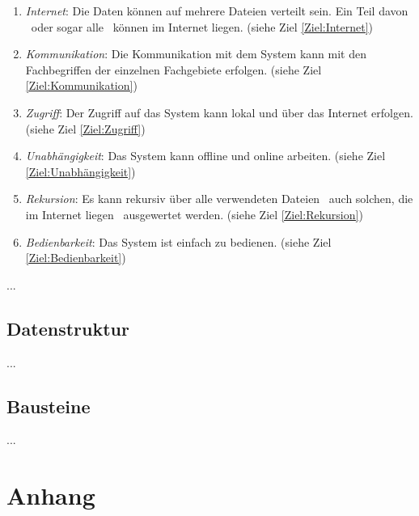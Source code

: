 \documentclass[english,ngerman,parskip=half,headsepline,footsepline]{scrreprt}
\begin{document}
\begin{enumerate}
		\item \label{Anforderung:Internet} \emph{Internet}: Die Daten können auf mehrere Dateien verteilt sein. Ein Teil davon \textendash\ oder sogar alle \textendash\ können im Internet liegen. (siehe Ziel \vref{Ziel:Internet})
		
		\item \label{Anforderung:Kommunikation} \emph{Kommunikation}: Die Kommunikation mit dem System kann mit den Fachbegriffen der einzelnen Fachgebiete erfolgen. (siehe Ziel \vref{Ziel:Kommunikation})
		
		\item \label{Anforderung:Zugriff} \emph{Zugriff}: Der Zugriff auf das System kann lokal und über das Internet erfolgen. (siehe Ziel \vref{Ziel:Zugriff})
		
		\item \label{Anforderung:Unabhängigkeit} \emph{Unabhängigkeit}: Das System kann offline und online arbeiten. (siehe Ziel \vref{Ziel:Unabhängigkeit})
		
		\item \label{Anforderung:Rekursion} \emph{Rekursion}: Es kann rekursiv über alle verwendeten Dateien \textendash\ auch solchen, die im Internet liegen \textendash\ ausgewertet werden. (siehe Ziel \vref{Ziel:Rekursion})
		
		\item \label{Anforderung:Bedienbarkeit} \emph{Bedienbarkeit}: Das System ist einfach zu bedienen. (siehe Ziel \vref{Ziel:Bedienbarkeit})
		
	\end{enumerate}

	... %
	
	\section{Datenstruktur}
	\label{Datenstruktur}
	
	... %
	
	\section{Bausteine}
	\label{Bausteine}
	
	... %
	

	\appendix
	
	\chapter{Anhang}
	\thispagestyle{scrheadings}
	
\end{document}
